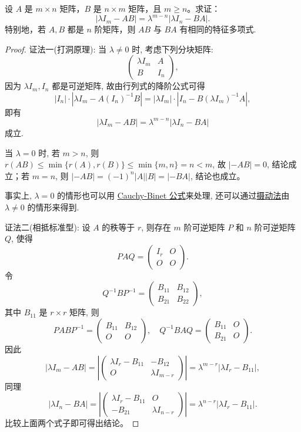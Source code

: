 \documentclass[lang=cn,newtx,10pt,scheme=chinese]{elegantbook}
\begin{document}
\begin{theorem}[特征值的降价公式]\label{theorem:特征值的降价公式}
设 \( A \) 是 \( m \times n \) 矩阵，\( B \) 是 \( n \times m \) 矩阵，且 \( m \geq n \)。求证：
\[
|\lambda I_m - AB| = \lambda^{m-n} |\lambda I_n - BA|.
\]
特别地，若 \( A, B \) 都是 \( n \) 阶矩阵，则 \( AB \) 与 \( BA \) 有相同的特征多项式.
\end{theorem}
\begin{proof}
{\color{blue}证法一(打洞原理):} 当 \(\lambda \neq 0\) 时, 考虑下列分块矩阵:
\[
\begin{pmatrix}
\lambda I_m & A \\
B & I_n
\end{pmatrix},
\]
因为 \(\lambda I_m, I_n\) 都是可逆矩阵, 故由行列式的降阶公式可得
\[
|I_n| \cdot |\lambda I_m - A(I_n)^{-1}B| = |\lambda I_m| \cdot |I_n - B(\lambda I_m)^{-1}A|,
\]
即有
\[
|\lambda I_m - AB| = \lambda^{m-n} |\lambda I_n - BA|
\]
成立.

当 \(\lambda = 0\) 时, 若 \(m > n\), 则 \(r(AB) \leq \min\{r(A), r(B)\} \leq \min\{m, n\} = n < m\), 故 \(|-AB| = 0\), 结论成立；若 \(m = n\), 则 \(|-AB| = (-1)^n |A||B| = |-BA|\), 结论也成立。

事实上, \(\lambda = 0\) 的情形也可以用 \hyperref[theorem:Cauchy-Binet公式]{Cauchy-Binet 公式}来处理, 还可以通过\hyperref[proposition:摄动法基本命题]{摄动法}由 \(\lambda \neq 0\) 的情形来得到.

{\color{blue}证法二(相抵标准型):} 设 \(A\) 的秩等于 \(r\), 则存在 \(m\) 阶可逆矩阵 \(P\) 和 \(n\) 阶可逆矩阵 \(Q\), 使得
\[
PAQ = \begin{pmatrix}
I_r & O \\
O & O
\end{pmatrix}.
\]
令
\[
Q^{-1}BP ^{-1}= \begin{pmatrix}
B_{11} & B_{12} \\
B_{21} & B_{22}
\end{pmatrix},
\]
其中 \(B_{11}\) 是 \(r \times r\) 矩阵, 则
\[
PABP^{-1} = \begin{pmatrix}
B_{11} & B_{12} \\
O & O
\end{pmatrix}, \quad Q^{-1}BAQ = \begin{pmatrix}
B_{11} & O \\
B_{21} & O
\end{pmatrix}.
\]
因此
\[
|\lambda I_m - AB| = \left| \begin{pmatrix}
\lambda I_r - B_{11} & -B_{12} \\
O & \lambda I_{m-r}
\end{pmatrix} \right| = \lambda^{m-r} |\lambda I_r - B_{11}|,
\]
同理
\[
|\lambda I_n - BA| = \left| \begin{pmatrix}
\lambda I_r - B_{11} & O \\
-B_{21} & \lambda I_{n-r}
\end{pmatrix} \right| = \lambda^{n-r} |\lambda I_r - B_{11}|.
\]
比较上面两个式子即可得出结论。


\end{proof}
\end{document}
